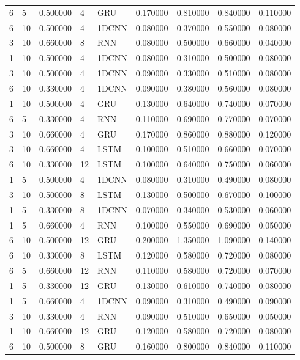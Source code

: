\begin{tabular}{llrllrrrr}
6 & 5 & 0.500000 & 4 & GRU & 0.170000 & 0.810000 & 0.840000 & 0.110000 \\
6 & 10 & 0.500000 & 4 & 1DCNN & 0.080000 & 0.370000 & 0.550000 & 0.080000 \\
3 & 10 & 0.660000 & 8 & RNN & 0.080000 & 0.500000 & 0.660000 & 0.040000 \\
1 & 10 & 0.500000 & 4 & 1DCNN & 0.080000 & 0.310000 & 0.500000 & 0.080000 \\
3 & 10 & 0.500000 & 4 & 1DCNN & 0.090000 & 0.330000 & 0.510000 & 0.080000 \\
6 & 10 & 0.330000 & 4 & 1DCNN & 0.090000 & 0.380000 & 0.560000 & 0.080000 \\
1 & 10 & 0.500000 & 4 & GRU & 0.130000 & 0.640000 & 0.740000 & 0.070000 \\
6 & 5 & 0.330000 & 4 & RNN & 0.110000 & 0.690000 & 0.770000 & 0.070000 \\
3 & 10 & 0.660000 & 4 & GRU & 0.170000 & 0.860000 & 0.880000 & 0.120000 \\
3 & 10 & 0.660000 & 4 & LSTM & 0.100000 & 0.510000 & 0.660000 & 0.070000 \\
6 & 10 & 0.330000 & 12 & LSTM & 0.100000 & 0.640000 & 0.750000 & 0.060000 \\
1 & 5 & 0.500000 & 4 & 1DCNN & 0.080000 & 0.310000 & 0.490000 & 0.080000 \\
3 & 10 & 0.500000 & 8 & LSTM & 0.130000 & 0.500000 & 0.670000 & 0.100000 \\
1 & 5 & 0.330000 & 8 & 1DCNN & 0.070000 & 0.340000 & 0.530000 & 0.060000 \\
1 & 5 & 0.660000 & 4 & RNN & 0.100000 & 0.550000 & 0.690000 & 0.050000 \\
6 & 10 & 0.500000 & 12 & GRU & 0.200000 & 1.350000 & 1.090000 & 0.140000 \\
6 & 10 & 0.330000 & 8 & LSTM & 0.120000 & 0.580000 & 0.720000 & 0.080000 \\
6 & 5 & 0.660000 & 12 & RNN & 0.110000 & 0.580000 & 0.720000 & 0.070000 \\
1 & 5 & 0.330000 & 12 & GRU & 0.130000 & 0.610000 & 0.740000 & 0.080000 \\
1 & 5 & 0.660000 & 4 & 1DCNN & 0.090000 & 0.310000 & 0.490000 & 0.090000 \\
3 & 10 & 0.330000 & 4 & RNN & 0.090000 & 0.510000 & 0.650000 & 0.050000 \\
1 & 10 & 0.660000 & 12 & GRU & 0.120000 & 0.580000 & 0.720000 & 0.080000 \\
6 & 10 & 0.500000 & 8 & GRU & 0.160000 & 0.800000 & 0.840000 & 0.110000 \\

\end{tabular}
